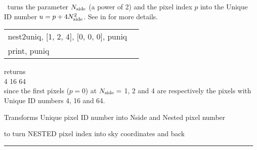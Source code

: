 \begin{codedescription}
{\thedocid\ turns the parameter $N_{\rm side}$ (a power of 2) and the pixel index $p$ into the Unique ID number $u = p + 4 N_{\rm side}^2$. See  in 
 for more details.
}
\end{codedescription}


\begin{example}
{
\begin{tabular}{ll} %
nest2uniq, [1, 2, 4], [0, 0, 0], puniq\\
print, puniq
\end{tabular}
}
{
\begin{minipage}{11cm}
returns  \\
   4 \hskip 1cm 16 \hskip 1cm 64 \\
since the first pixels ($p=0$) at $N_{\rm side}=$ 1, 2 and 4 are respectively the pixels with Unique ID numbers 4, 16 and 64.
\end{minipage}
}
\end{example}


\begin{related}
  \begin{sulist}{} %
  \item[\htmlref{uniq2nest}{idl:uniq2nest}] Transforms Unique \healpix pixel ID number into Nside and Nested pixel number
  \item[\htmlref{pix2xxx,...}{idl:pix_tools}] to turn NESTED pixel index into sky coordinates and back
  \end{sulist}
\end{related}

\rule{\hsize}{2mm}

